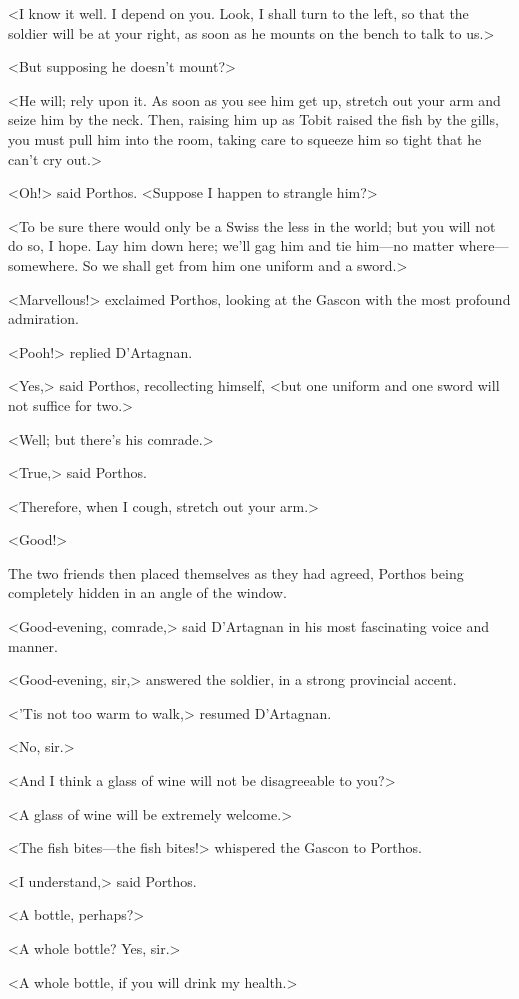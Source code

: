 <I know it well. I depend on you. Look, I shall turn to the left, so that the soldier will be at your right, as soon as he mounts on the bench to talk to us.>

<But supposing he doesn't mount?>

<He will; rely upon it. As soon as you see him get up, stretch out your arm and seize him by the neck. Then, raising him up as Tobit raised the fish by the gills, you must pull him into the room, taking care to squeeze him so tight that he can't cry out.>

<Oh!> said Porthos. <Suppose I happen to strangle him?>

<To be sure there would only be a Swiss the less in the world; but you will not do so, I hope. Lay him down here; we'll gag him and tie him—no matter where—somewhere. So we shall get from him one uniform and a sword.>

<Marvellous!> exclaimed Porthos, looking at the Gascon with the most profound admiration.

<Pooh!> replied D'Artagnan.

<Yes,> said Porthos, recollecting himself, <but one uniform and one sword will not suffice for two.>

<Well; but there's his comrade.>

<True,> said Porthos.

<Therefore, when I cough, stretch out your arm.>

<Good!>

The two friends then placed themselves as they had agreed, Porthos being completely hidden in an angle of the window.

<Good-evening, comrade,> said D'Artagnan in his most fascinating voice and manner.

<Good-evening, sir,> answered the soldier, in a strong provincial accent.

<'Tis not too warm to walk,> resumed D'Artagnan.

<No, sir.>

<And I think a glass of wine will not be disagreeable to you?>

<A glass of wine will be extremely welcome.>

<The fish bites—the fish bites!> whispered the Gascon to Porthos.

<I understand,> said Porthos.

<A bottle, perhaps?>

<A whole bottle? Yes, sir.>

<A whole bottle, if you will drink my health.>

